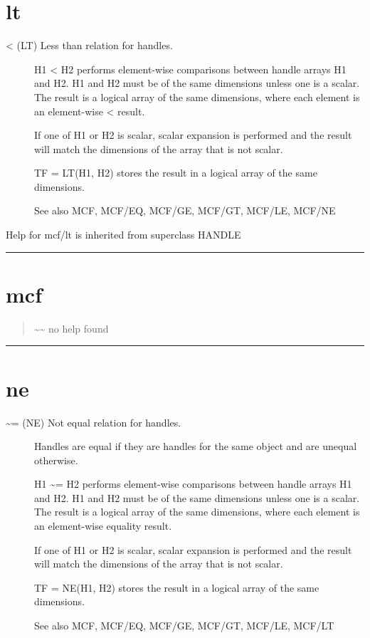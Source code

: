 \documentclass[letterpaper,10pt,english]{sphinxmanual}
\begin{document}
\section{lt}
\label{classes/utils/@mcf/mcf:lt}\label{classes/utils/@mcf/mcf:id14}\begin{description}
\item[{\textless{} (LT)   Less than relation for handles.}] \leavevmode
H1 \textless{} H2 performs element-wise comparisons between handle arrays H1 and
H2.  H1 and H2 must be of the same dimensions unless one is a scalar.
The result is a logical array of the same dimensions, where each
element is an element-wise \textless{} result.

If one of H1 or H2 is scalar, scalar expansion is performed and the
result will match the dimensions of the array that is not scalar.

TF = LT(H1, H2) stores the result in a logical array of the same
dimensions.

See also MCF, MCF/EQ, MCF/GE, MCF/GT, MCF/LE, MCF/NE

\end{description}

Help for mcf/lt is inherited from superclass HANDLE


\bigskip\hrule{}\bigskip



\section{mcf}
\label{classes/utils/@mcf/mcf:mcf}\label{classes/utils/@mcf/mcf:id15}\begin{quote}

\textasciitilde{}\textasciitilde{} no help found
\end{quote}


\bigskip\hrule{}\bigskip



\section{ne}
\label{classes/utils/@mcf/mcf:ne}\label{classes/utils/@mcf/mcf:id16}\begin{description}
\item[{\textasciitilde{}= (NE)   Not equal relation for handles.}] \leavevmode
Handles are equal if they are handles for the same object and are
unequal otherwise.

H1 \textasciitilde{}= H2 performs element-wise comparisons between handle arrays H1
and H2.  H1 and H2 must be of the same dimensions unless one is a
scalar.  The result is a logical array of the same dimensions, where
each element is an element-wise equality result.

If one of H1 or H2 is scalar, scalar expansion is performed and the
result will match the dimensions of the array that is not scalar.

TF = NE(H1, H2) stores the result in a logical array of the same
dimensions.

See also MCF, MCF/EQ, MCF/GE, MCF/GT, MCF/LE, MCF/LT

\end{description}
\end{document}
